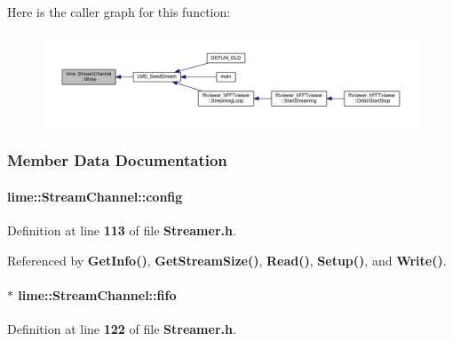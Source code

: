 Here is the caller graph for this function\+:
\nopagebreak
\begin{figure}[H]
\begin{center}
\leavevmode
\includegraphics[width=350pt]{d7/db1/classlime_1_1StreamChannel_a7c8c7d8be9b371665a23482b8b713480_icgraph}
\end{center}
\end{figure}




\subsubsection{Member Data Documentation}
\paragraph[{config}]{ lime\+::\+Stream\+Channel\+::config}\label{classlime_1_1StreamChannel_a4b29b8f3a032d5587df92caf08125d73}


Definition at line {\bf 113} of file {\bf Streamer.\+h}.



Referenced by {\bf Get\+Info()}, {\bf Get\+Stream\+Size()}, {\bf Read()}, {\bf Setup()}, and {\bf Write()}.

\paragraph[{fifo}]{$\ast$ lime\+::\+Stream\+Channel\+::fifo\hspace{0.3cm}{\ttfamily [protected]}}\label{classlime_1_1StreamChannel_a9a825226b323419a4bab9bd49a05bc1d}


Definition at line {\bf 122} of file {\bf Streamer.\+h}.



